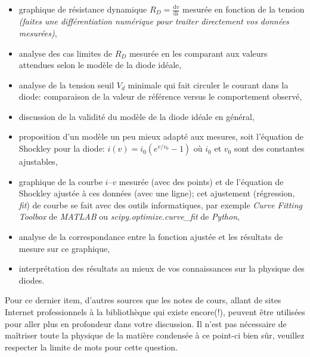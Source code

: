 \documentclass[canadien,12pt,oneside,letterpaper]{article}
\begin{document}
\begin{gradescope}[resume]
\begin{itemize}
    \item graphique de résistance dynamique $R_{D}=\frac{\mathrm{d}v}{\mathrm{d}i}$ mesurée en fonction de la tension \emph{(faites une différentiation numérique pour traiter directement vos données mesurées)},
    \item analyse des cas limites de $R_{D}$ mesurée en les comparant aux valeurs attendues selon le modèle de la diode idéale,
    \item analyse de la tension seuil $V_{d}$ minimale qui fait circuler le courant dans la diode: comparaison de la valeur de référence versus le comportement observé, 
    \item discussion de la validité du modèle de la diode idéale en général,
    \item proposition d'un modèle un peu mieux adapté aux mesures, soit l'équation de Shockley pour la diode: $i\left( v\right) = i_0\left(e^{v/v_0}-1 \right)$ où $i_0$ et $v_0$ sont des constantes ajustables,
    \item graphique de la courbe $i$--$v$ mesurée (avec des points) et de l'équation de Shockley ajustée à ces données (avec une ligne); cet ajustement (régression, \textit{fit}) de courbe se fait avec des outils informatiques, par exemple \textit{Curve Fitting Toolbox} de \textit{MATLAB} ou \textit{scipy.optimize.curve\_fit} de \textit{Python},
    \item analyse de la correspondance entre la fonction ajustée et les résultats de mesure sur ce graphique,
    \item interprétation des résultats au mieux de vos connaissances sur la physique des diodes.
\end{itemize}
\end{gradescope}

Pour ce dernier item, d'autres sources que les notes de cours, allant de sites Internet professionnels à la bibliothèque qui existe encore(!), peuvent être utilisées pour aller plus en profondeur dans votre discussion. Il n'est pas nécessaire de maîtriser toute la physique de la matière condensée à ce point-ci bien sûr, veuillez respecter la limite de mots pour cette question.
\end{document}
